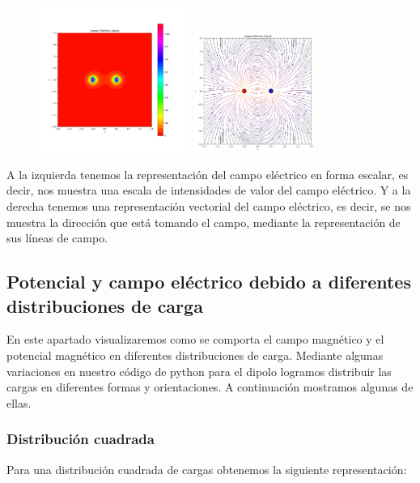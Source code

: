 \documentclass[11pt]{article}
\begin{document}
    \begin{figure}[h]
        \vspace{-1cm}
        \centering
        \includegraphics[width=0.44\textwidth]{dipolo4.PNG} 
        \includegraphics[width=0.35\textwidth]{dipolo 5.PNG}
    \end{figure}
    
    \vspace{0.4cm} A la izquierda tenemos la representación del campo eléctrico en forma escalar, es decir, nos muestra una escala de intensidades de valor del campo eléctrico. Y a la derecha tenemos una representación vectorial del campo eléctrico, es decir, se nos muestra la dirección que está tomando el campo, mediante la representación de sus líneas de campo. 

\clearpage
\subsection{Potencial y campo eléctrico debido a diferentes distribuciones de carga}
    En este apartado visualizaremos como se comporta el campo magnético y el potencial magnético en diferentes distribuciones de carga. Mediante algunas variaciones en nuestro código de python para el dipolo logramos distribuir las cargas en diferentes formas y orientaciones. A continuación mostramos algunas de ellas.

\vspace{-0.2cm}
\subsubsection{Distribución cuadrada}
    Para una distribución cuadrada de cargas obtenemos la siguiente representación:
    
\end{document}
